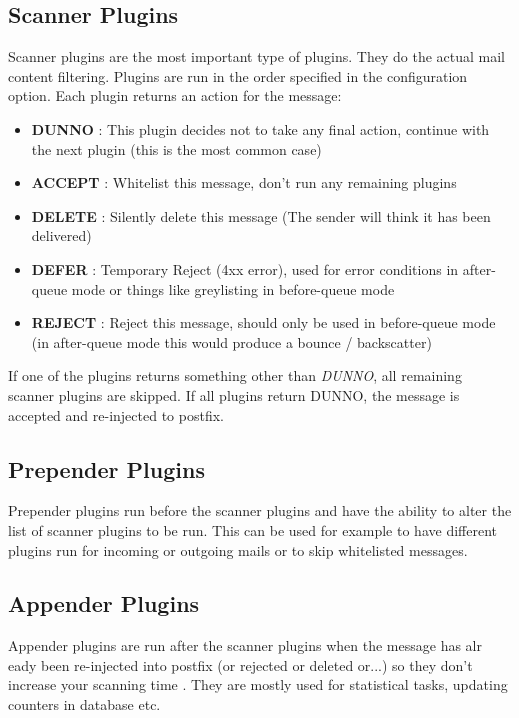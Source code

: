 \documentclass[letterpaper,10pt,english]{sphinxmanual}
\begin{document}
\subsection{Scanner Plugins}
\label{plugins-index:scanner-plugins}
Scanner plugins are the most important type of plugins. They do the actual mail content filtering.
Plugins are run in the order specified in the  configuration option. Each plugin returns an action
for the message:
\begin{itemize}
\item {} 
\textbf{DUNNO}  : This plugin decides not to take any final action, continue with the next plugin (this is the most common case)

\item {} 
\textbf{ACCEPT} : Whitelist this message, don't run any remaining plugins

\item {} 
\textbf{DELETE} : Silently delete this message (The sender will think it has been delivered)

\item {} 
\textbf{DEFER}  : Temporary Reject (4xx error), used for error conditions in after-queue mode or things like greylisting in before-queue mode

\item {} 
\textbf{REJECT} : Reject this message, should only be used in before-queue mode (in after-queue mode this would produce a bounce / backscatter)

\end{itemize}

If one of the plugins returns something other than \emph{DUNNO}, all remaining scanner plugins are skipped.
If all plugins return DUNNO, the message is accepted and re-injected to postfix.


\subsection{Prepender Plugins}
\label{plugins-index:prepender-plugins}
Prepender plugins run before the scanner plugins and have the ability to alter the
list of scanner plugins to be run. This can be used for example to have different plugins
run for incoming or outgoing mails or to skip whitelisted messages.


\subsection{Appender Plugins}
\label{plugins-index:appender-plugins}
Appender plugins are run after the scanner plugins when the message has alr
eady been re-injected into postfix
(or rejected or deleted or...) so they don't increase your scanning time . They are mostly used for statistical tasks, updating counters in database etc.
\end{document}
